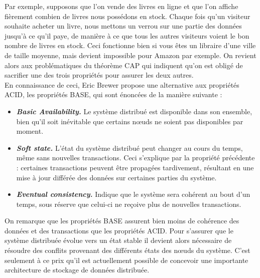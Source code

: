 	Par exemple, supposons que l'on vende des livres en ligne et que l'on affiche fièrement combien de livres nous possédons en stock. Chaque fois qu'un visiteur souhaite acheter un livre, nous mettons un verrou sur une partie des données jusqu'à ce qu'il paye, de manière à ce que tous les autres visiteurs voient le bon nombre de livres en stock. Ceci fonctionne bien si vous êtes un libraire d'une ville de taille moyenne, mais devient impossible pour Amazon par exemple. On revient alors aux problématiques du théorème CAP qui indiquent qu'on est obligé de sacrifier une des trois propriétés pour assurer les deux autres.\\

	En connaissance de ceci, Eric Brewer propose une alternative aux propriétés ACID, les propriétés BASE, qui sont énoncées de la manière suivante :
	\vspace{10px}
	\begin{itemize}
	 	\item \textbf{\textit{Basic Availability.}} Le système distribué est disponible dans son ensemble, bien qu'il soit inévitable que certains nœuds ne soient pas disponibles par moment.
	 	\item \textbf{\textit{Soft state.}} L'état du système distribué peut changer au cours du temps, même sans nouvelles transactions. Ceci s'explique par la propriété précédente : certaines transactions peuvent être propagées tardivement, résultant en une mise à jour différée des données sur certaines parties du système.
	 	\item \textbf{\textit{Eventual consistency.}} Indique que le système sera cohérent au bout d'un temps, sous réserve que celui-ci ne reçoive plus de nouvelles transactions.
	 \end{itemize}
	 \vspace{20px}
	 On remarque que les propriétés BASE assurent bien moins de cohérence des données et des transactions que les propriétés ACID. Pour s'assurer que le système distribuée évolue vers un état stable il devient alors nécessaire de résoudre des conflits provenant des différents états des nœuds du système. C'est seulement à ce prix qu'il est actuellement possible de concevoir une importante architecture de stockage de données distribuée. 